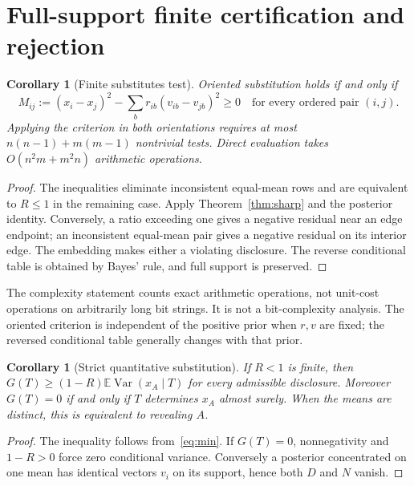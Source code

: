\documentclass[11pt,a4paper]{article}
\newtheorem{corollary}[theorem]{Corollary}
\newcommand{\E}{\mathbb E}
\newcommand{\Var}{\operatorname{Var}}
\begin{document}
\section{Full-support finite certification and rejection}
\begin{corollary}[Finite substitutes test]\label{cor:test}
Oriented substitution holds if and only if
\begin{equation}\label{eq:margin}
 M_{ij}:=(x_i-x_j)^2-\sum_b r_{ib}(v_{ib}-v_{jb})^2\geq0
 \quad\text{for every ordered pair }(i,j).
\end{equation}
Applying the criterion in both orientations requires at most $n(n-1)+m(m-1)$ nontrivial tests. Direct evaluation takes $O(n^2m+m^2n)$ arithmetic operations.
\end{corollary}
\begin{proof}
The inequalities eliminate inconsistent equal-mean rows and are equivalent to $R\leq1$ in the remaining case. Apply Theorem~\ref{thm:sharp} and the posterior identity. Conversely, a ratio exceeding one gives a negative residual near an edge endpoint; an inconsistent equal-mean pair gives a negative residual on its interior edge. The embedding makes either a violating disclosure. The reverse conditional table is obtained by Bayes' rule, and full support is preserved.
\end{proof}
The complexity statement counts exact arithmetic operations, not unit-cost operations on arbitrarily long bit strings. It is not a bit-complexity analysis. The oriented criterion is independent of the positive prior when $r,v$ are fixed; the reversed conditional table generally changes with that prior.

\begin{corollary}[Strict quantitative substitution]\label{cor:strict}
If $R<1$ is finite, then $G(T)\geq(1-R)\E\Var(x_A\mid T)$ for every admissible disclosure. Moreover $G(T)=0$ if and only if $T$ determines $x_A$ almost surely. When the means are distinct, this is equivalent to revealing $A$.
\end{corollary}
\begin{proof}
The inequality follows from~\eqref{eq:min}. If $G(T)=0$, nonnegativity and $1-R>0$ force zero conditional variance. Conversely a posterior concentrated on one mean has identical vectors $v_i$ on its support, hence both $D$ and $N$ vanish.
\end{proof}
\end{document}
